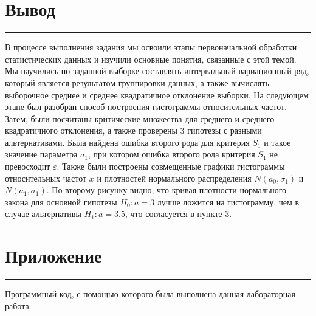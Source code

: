 \documentclass[a4paper, 14pt]{extarticle}
\begin{document}
\section*{Вывод}\vspace{-20pt}\rule{\linewidth}{0.1mm}

В процессе выполнения задания мы освоили этапы первоначальной обработки статистических 
данных и изучили основные понятия, связанные с этой темой. Мы научились по заданной выборке 
составлять интервальный вариационный ряд, который является результатом группировки данных, 
а также вычислять выборочное среднее и среднее квадратичное отклонение выборки. 
На следующем этапе был разобран способ построения гистограммы относительных частот. 
Затем, были посчитаны критические множества для среднего и среднего квадратичного отклонения, 
а также проверены 3 гипотезы с разными альтернативами. Была найдена ошибка второго рода для 
критерия $S_1$ и такое значение параметра $a_1$, при котором ошибка второго рода критерия $S_1$ не 
превосходит $\varepsilon$. Также были построены совмещенные графики гистограммы относительных частот $x$ и 
плотностей нормального распределения $N(a_0,\sigma_1 )$ и $N(a_1,\sigma_1 )$. По второму рисунку видно, 
что кривая плотности нормального закона для основной гипотезы $H_0:a=3$ лучше ложится на 
гистограмму, чем в случае альтернативы $H_1:a=3.5$, что согласуется в пункте 3.


\newpage

\section*{Приложение}\vspace{-20pt}\rule{\linewidth}{0.1mm}

Программный код, с помощью которого была выполнена данная лабораторная работа.\\
\end{document}
